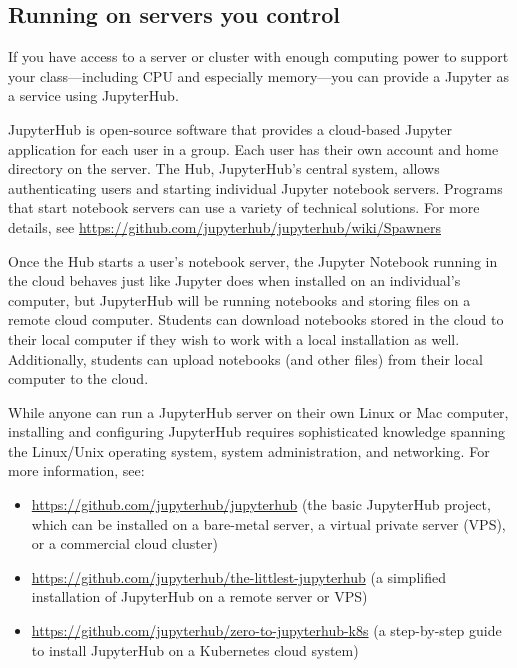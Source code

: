 \documentclass[]{book}
\begin{document}
\hypertarget{running-on-servers-you-control}{%
\subsection{Running on servers you control}\label{running-on-servers-you-control}}

If you have access to a server or cluster with enough computing power
to support your class---including CPU and especially memory---you can
provide a Jupyter as a service using JupyterHub.

JupyterHub is open-source software that provides a cloud-based Jupyter
application for each user in a group. Each user has their own account
and home directory on the server. The Hub, JupyterHub's central
system, allows authenticating users and starting individual Jupyter
notebook servers. Programs that start notebook servers can use a
variety of technical solutions. For more details, see
\url{https://github.com/jupyterhub/jupyterhub/wiki/Spawners}

Once the Hub starts a user's notebook server, the Jupyter Notebook
running in the cloud behaves just like Jupyter does when installed on
an individual's computer, but JupyterHub will be running notebooks and
storing files on a remote cloud computer. Students can download
notebooks stored in the cloud to their local computer if they wish to
work with a local installation as well. Additionally, students can
upload notebooks (and other files) from their local computer to the
cloud.

While anyone can run a JupyterHub server on their own Linux or Mac
computer, installing and configuring JupyterHub requires sophisticated
knowledge spanning the Linux/Unix operating system, system
administration, and networking. For more information, see:

\begin{itemize}
\item
  \url{https://github.com/jupyterhub/jupyterhub} (the basic JupyterHub
  project, which can be installed on a bare-metal server, a virtual
  private server (VPS), or a commercial cloud cluster)
\item
  \url{https://github.com/jupyterhub/the-littlest-jupyterhub} (a
  simplified installation of JupyterHub on a remote server or VPS)
\item
  \url{https://github.com/jupyterhub/zero-to-jupyterhub-k8s} (a
  step-by-step guide to install JupyterHub on a Kubernetes cloud
  system)
\end{itemize}
\end{document}
